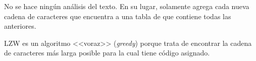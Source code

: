 No se hace ningún análisis del texto. En su lugar, solamente agrega cada nueva cadena de caracteres que encuentra a una tabla de que contiene todas las anteriores.

LZW es un algoritmo <<voraz>> (\textit{greedy}) porque trata de encontrar la cadena de caracteres más larga posible para la cual tiene código asignado.


%
